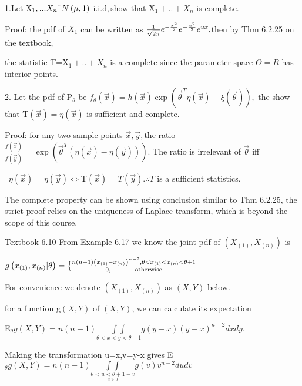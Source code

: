 \documentclass{article}
\def\QATOPD#1#2#3#4{{#3 \atopwithdelims#1#2 #4}}%
\begin{document}
1.Let X$_{1},...X_{n}\symbol{126}N\left( \mu ,1\right) $ i.i.d$,$show that X$%
_{1}+..+X_{n}$ is complete.

Proof: the pdf of $X_{1}$ can be written as $\frac{1}{\sqrt{2\pi }}e^{-\frac{%
x^{2}}{2}}e^{-\frac{u^{2}}{2}}e^{ux},$then by Thm 6.2.25 on the textbook,

the statistic T=X$_{1}+..+X_{n}$ is a complete since the parameter space $%
\Theta =R$ has interior points.

2. Let the pdf of P$_{\theta }$ be $f_{\theta }\left( \vec{x}\right)
=h\left( \vec{x}\right) \exp \left( \vec{\theta}^{T}\eta \left( \vec{x}%
\right) -\xi \left( \vec{\theta}\right) \right) ,$ the show that T$\left( 
\vec{x}\right) =\eta \left( \vec{x}\right) $ is sufficient and complete.

Proof: for any two sample points $\vec{x},\vec{y},$the ratio$\frac{f\left( 
\vec{x}\right) }{f\left( \vec{y}\right) }=\exp \left( \vec{\theta}^{T}\left(
\eta \left( \vec{x}\right) -\eta \left( \vec{y}\right) \right) \right) .$
The ratio is irrelevant of $\vec{\theta}$ iff

\bigskip\ $\eta \left( \vec{x}\right) =\eta \left( \vec{y}\right) \iff $T$%
\left( \vec{x}\right) =T\left( \vec{y}\right) .\therefore T$ is a sufficient
statistics.

\bigskip The complete property can be shown using conclusion similar to Thm
6.2.25, the strict proof relies on the uniqueness of Laplace transform,
which is beyond the scope of this course.

\bigskip

Textbook 6.10 From Example 6.17 we know the joint pdf of $\left( X_{\left(
1\right) },X_{\left( n\right) }\right) $ is

$g\left( x_{\left( 1\right) },x_{\left( n\right) }|\theta \right) =\QATOPD\{
. {n\left( n-1\right) \left( x_{\left( 1\right) }-x_{\left( n\right)
}\right) ^{n-2},\theta <x_{\left( 1\right) }<x_{\left( n\right) }<\theta
+1}{0,\text{ \ \ \ \ \ \ \ \ \ \ otherwise}}$

For convenience we denote $\left( X_{\left( 1\right) },X_{\left( n\right)
}\right) $ as $\left( X,Y\right) $ below.

for a function g$\left( X,Y\right) $ of $\left( X,Y\right) $, we can
calculate its expectation

E$_{\theta }g\left( X,Y\right) =n\left( n-1\right) \underset{\theta
<x<y<\theta +1}{\int \int }g\left( y-x\right) \left( y-x\right) ^{n-2}dxdy.$

Making the transformation u=x,v=y-x gives E$_{\theta }g\left( X,Y\right)
=n\left( n-1\right) \underset{\underset{v>0}{\theta <u<\theta +1-v}}{\int
\int }g\left( v\right) v^{n-2}dudv$
\end{document}
